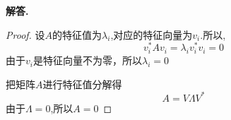 \documentclass[12pt, a4paper, oneside]{ctexart}
\newcounter{problemname}
\newenvironment{solution}{\par\noindent\textbf{解答. }}{\par}
\newenvironment{note}{\par\noindent\textbf{题目\arabic{problemname}的注记. }}{\par}
\begin{document}
\begin{solution}
    \begin{proof}
        设$A$的特征值为$\lambda_i$,对应的特征向量为$v_i$.所以,
        \begin{equation*}
            v_i^*Av_i=\lambda_i v_i^* v_i=0
        \end{equation*}
        由于$v_i$是特征向量不为零，所以$\lambda_i=0$

        把矩阵$A$进行特征值分解得
        \begin{equation*}
            A=V\Lambda V^*
        \end{equation*}
        由于$\Lambda=0$,所以$A=0$
    \end{proof}
\end{solution}
\end{document}
